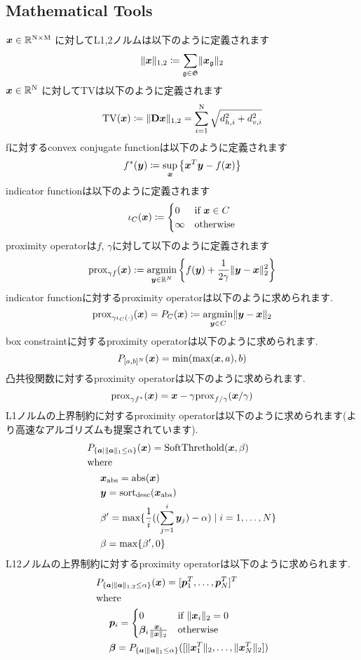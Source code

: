 \subsection{Mathematical Tools}\label{subsec:mathematical-tools}
$\vecx \in \realNumber^{\intN \times \intM}$ に対してL1,2ノルムは以下のように定義されます
\begin{equation} \label{eq:L12NormDefinitionEq} \LOneTwoNormDefinition \end{equation}
$\vecx \in \realNumber^{\intN}$ に対してTV\cite{TV}は以下のように定義されます
\begin{equation} \label{eq:TVDefinitionEq} \TotalVariationDefinition \end{equation}
fに対するconvex conjugate functionは以下のように定義されます
\begin{equation} \label{eq:ConjugateFunctionDefinitionEq} \conjugateFunctionDefinition \end{equation}
indicator functionは以下のように定義されます
\begin{equation} \label{eq:IndicatorFunctionDefinitionEq} \indicatorFunctionDefinition \end{equation}
proximity operatorは$f$, $\gamma$に対して以下のように定義されます
\begin{equation} \label{eq:ProximityOperatorDefinitionEq} \proximityOperatorDefinition \end{equation}
indicator functionに対するproximity operatorは以下のように求められます.
\begin{equation} \label{eq:ProximityOperatorDefinitionWithIndicatorFunctionEq}
\proximityOperator{ \gamma \indicatorFunction{C}{\cdot} }{\vecx} = P_C(\vecx) \coloneq \argmin{\vecy \in C} \LTwoNorm{\vecy - \vecx}
\end{equation}
box constraintに対するproximity operatorは以下のように求められます.
\begin{equation} \label{eq:ProximityOperatorForBoxConstraint} \projBoxSolution \end{equation}
凸共役関数に対するproximity operatorは以下のように求められます\cite[Theorem 3.1 (ii)]{prox-convex-conjugate-function}.
\begin{equation} \label{eq:ProximityOperatorDefinitionWithConvexConjugateFunctionEq} \proximityOperatorDefinitionWithConvexConjugateFunction \end{equation}
L1ノルムの上界制約に対するproximity operatorは以下のように求められます\cite{L1-ball-projection}(より高速なアルゴリズムも提案されています\cite{fast-L1-ball-projection}).
\begin{equation} \label{eq:ProximityOperatorForL1Ball}  \projLOneBallSolution \end{equation}
L12ノルムの上界制約に対するproximity operatorは以下のように求められます\cite{L12-ball-projection}.
\begin{equation} \label{eq:ProximityOperatorForL12Ball} \projLOneTwoBallSolution \end{equation}

